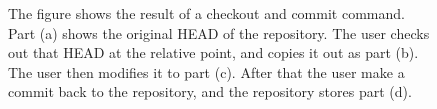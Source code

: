 \begin{figure}[t]
\caption{The figure shows the result of a checkout and commit command.
Part (a) shows the original HEAD of the repository. The user checks out that
HEAD at the relative point, and copies it out as part (b). The user then
modifies it to part (c). After that the user make a commit back to the
repository, and the repository stores part (d). 
}

\label{f:checkout-commit}
\end{figure}

\endinput


